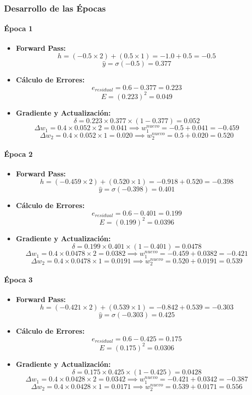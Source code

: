 \documentclass[12pt]{article}
\begin{document}
\subsubsection*{Desarrollo de las Épocas}

\paragraph{Época 1}
\begin{itemize}
    \item \textbf{Forward Pass:}
    \[ h = (-0.5 \times 2) + (0.5 \times 1) = -1.0 + 0.5 = -0.5 \]
    \[ \hat{y} = \sigma(-0.5) = 0.377 \]
    \item \textbf{Cálculo de Errores:}
    \[ e_{residual} = 0.6 - 0.377 = 0.223 \]
    \[ E = (0.223)^2 = 0.049 \]
    \item \textbf{Gradiente y Actualización:}
    \[ \delta = 0.223 \times 0.377 \times (1 - 0.377) = 0.052 \]
    \[ \Delta w_1 = 0.4 \times 0.052 \times 2 = 0.041 \implies w_1^{nuevo} = -0.5 + 0.041 = -0.459 \]
    \[ \Delta w_2 = 0.4 \times 0.052 \times 1 = 0.020 \implies w_2^{nuevo} = 0.5 + 0.020 = 0.520 \]
\end{itemize}

\paragraph{Época 2}
\begin{itemize}
    \item \textbf{Forward Pass:}
    \[ h = (-0.459 \times 2) + (0.520 \times 1) = -0.918 + 0.520 = -0.398 \]
    \[ \hat{y} = \sigma(-0.398) = 0.401 \]
    \item \textbf{Cálculo de Errores:}
    \[ e_{residual} = 0.6 - 0.401 = 0.199 \]
    \[ E = (0.199)^2 = 0.0396 \]
    \item \textbf{Gradiente y Actualización:}
    \[ \delta = 0.199 \times 0.401 \times (1 - 0.401) = 0.0478 \]
    \[ \Delta w_1 = 0.4 \times 0.0478 \times 2 = 0.0382 \implies w_1^{nuevo} = -0.459 + 0.0382 = -0.421 \]
    \[ \Delta w_2 = 0.4 \times 0.0478 \times 1 = 0.0191 \implies w_2^{nuevo} = 0.520 + 0.0191 = 0.539 \]
\end{itemize}

\paragraph{Época 3}
\begin{itemize}
    \item \textbf{Forward Pass:}
    \[ h = (-0.421 \times 2) + (0.539 \times 1) = -0.842 + 0.539 = -0.303 \]
    \[ \hat{y} = \sigma(-0.303) = 0.425 \]
    \item \textbf{Cálculo de Errores:}
    \[ e_{residual} = 0.6 - 0.425 = 0.175 \]
    \[ E = (0.175)^2 = 0.0306 \]
    \item \textbf{Gradiente y Actualización:}
    \[ \delta = 0.175 \times 0.425 \times (1 - 0.425) = 0.0428 \]
    \[ \Delta w_1 = 0.4 \times 0.0428 \times 2 = 0.0342 \implies w_1^{nuevo} = -0.421 + 0.0342 = -0.387 \]
    \[ \Delta w_2 = 0.4 \times 0.0428 \times 1 = 0.0171 \implies w_2^{nuevo} = 0.539 + 0.0171 = 0.556 \]
\end{itemize}
\end{document}
